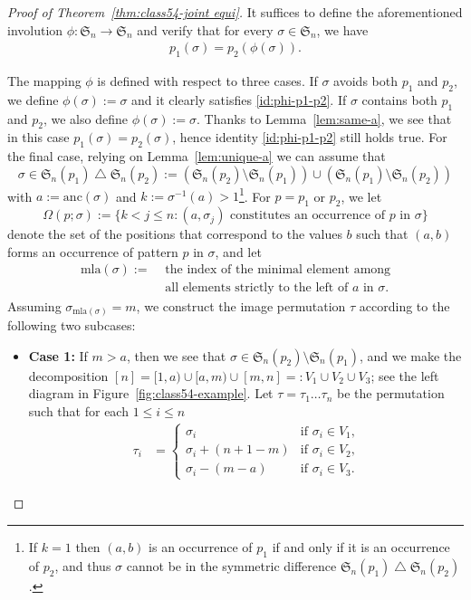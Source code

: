 \documentclass[12pt]{article}
\def\fS{\mathfrak{S}}
\def\anc{\mathrm{anc}}
\def\mla{\mathrm{mla}}
\begin{document}
\begin{proof}[Proof of Theorem~\ref{thm:class54-joint equi}]
It suffices to define the aforementioned involution $\phi:\fS_n\to \fS_n$ and verify that for every $\sigma\in\fS_n$, we have
\begin{align}\label{id:phi-p1-p2}
p_1(\sigma) = p_2(\phi(\sigma)).
\end{align}

The mapping $\phi$ is defined with respect to three cases. If $\sigma$ avoids both $p_1$ and $p_2$, we define $\phi(\sigma):=\sigma$ and it clearly satisfies \eqref{id:phi-p1-p2}. If $\sigma$ contains both $p_1$ and $p_2$, we also define $\phi(\sigma):=\sigma$. Thanks to Lemma~\ref{lem:same-a}, we see that in this case $p_1(\sigma)=p_2(\sigma)$, hence identity \eqref{id:phi-p1-p2} still holds true. For the final case, relying on Lemma~\ref{lem:unique-a} we can assume that 
$$\sigma\in \fS_n(p_1) \mathbin{\triangle} \fS_n(p_2):= \left(\fS_n(p_2)\setminus\fS_n(p_1)\right)\cup \left(\fS_n(p_1)\setminus\fS_n(p_2)\right)$$ 
with $a:=\anc(\sigma)$ and $k:=\sigma^{-1}(a)>1$\footnote{If $k=1$ then $(a,b)$ is an occurrence of $p_1$ if and only if it is an occurrence of $p_2$, and thus $\sigma$ cannot be in the symmetric difference $\fS_n(p_1) \mathbin{\triangle} \fS_n(p_2)$.}. For $p=p_1$ or $p_2$, we let
$$\Omega(p;\sigma):=\{k<j\le n:\text{$(a,\sigma_j)$ constitutes an occurrence of $p$ in $\sigma$}\}$$
denote the set of the positions that correspond to the values $b$ such that $(a,b)$ forms an occurrence of pattern $p$ in $\sigma$, and let 
\begin{align*}
\mla(\sigma):= & \text{ the index of the minimal element among}\\
& \text{ all elements strictly to the left of $a$ in $\sigma$.}
\end{align*} 
Assuming $\sigma_{\mla(\sigma)}=m$, we construct the image permutation $\tau$ according to the following two subcases:

\begin{itemize}
    \item \textbf{Case 1:} If $m > a$, then we see that $\sigma\in\fS_n(p_2)\setminus\fS_n(p_1)$, and we make the decomposition $[n]=[1,a)\cup[a,m)\cup[m,n]=:V_1\cup V_2\cup V_3$; see the left diagram in Figure~\ref{fig:class54-example}. Let $\tau=\tau_1\ldots \tau_n$ be the permutation such that for each $1\le i\le n$
    \begin{align*}
    \tau_i &=\begin{cases}
    \sigma_i & \text{if $\sigma_i\in V_1$,}\\
    \sigma_i+(n+1-m) & \text{if $\sigma_i\in V_2$,}\\
    \sigma_i-(m-a) & \text{if $\sigma_i\in V_3$.}
    \end{cases}
    \end{align*}
    

\end{itemize}
\end{proof}
\end{document}
